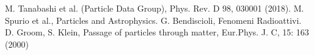 \begin{thebibliography}{90}             %
\rhead[\fancyplain{}{\bfseries \leftmark}]{\fancyplain{}{\bfseries
\thepage}}
 M. Tanabashi et al. (Particle Data Group), Phys. Rev. D 98, 030001 (2018).
 M. Spurio et al., Particles and Astrophysics.
 G. Bendiscioli, Fenomeni Radioattivi.
 D. Groom, S. Klein, Passage of particles through matter, Eur.Phys. J. C, 15: 163 (2000)
\end{thebibliography}

